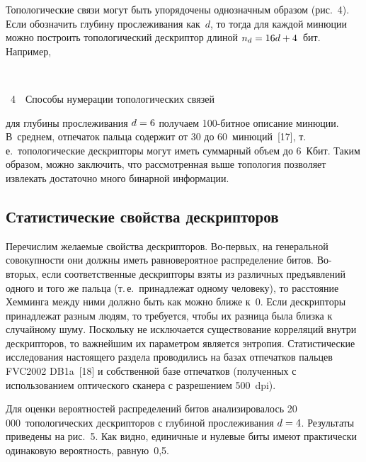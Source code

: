 \begin{multicols}{2}
      
      Топологические связи могут быть упорядочены однозначным образом (рис.~4). 
Если обозначить глу\-бин\-у прослеживания как~$d$, то тогда для каж\-дой минюции можно 
построить топологический дескриптор длиной $n_d\hm = 16d \hm+ 4$~бит. Например,\linebreak\vspace*{-12pt}
\begin{center} %
\vspace*{1pt}
\mbox{%
 \epsfxsize=77.746mm
}

\vspace*{9pt}
{{\figurename~4}\ \ \small{Способы нумерации топологических связей}}
\end{center}

\vspace*{6pt}

\addtocounter{figure}{1}


\noindent 
для глубины прослеживания $d \hm= 6$ получаем 100-бит\-ное описание минюции. 
В~среднем, отпечаток пальца содержит от 30 до 60~минюций~[17], т.\,е.\ 
топологические дескрипторы могут иметь суммарный объем до 6~Кбит. Таким образом, 
можно заключить, что рассмотренная выше топология позволяет извлекать достаточно 
много бинарной информации. 

\subsection{Статистические свойства дескрипторов}

      Перечислим желаемые свойства дескрипторов. Во-пер\-вых, на генеральной 
совокупности они должны иметь равновероятное распределение битов. Во-вто\-рых, если 
соответственные дескрипторы взяты из различных предъявлений одного и того же пальца 
(т.\,е.\ принадлежат одному человеку), то расстояние Хемминга между ними должно быть 
как можно ближе к~0. Если дескрипторы принадлежат разным людям, то требуется, чтобы 
их разница была близка к случайному шуму. Поскольку не исключается существование 
корреляций внутри дескрипторов, то важнейшим их параметром является энтропия. 
Статистические исследования настоящего раздела проводились на базах отпечатков 
пальцев FVC2002 DB1a~[18] и собственной базе отпечатков (полученных с 
использованием оптического сканера с разрешением 500~dpi).
      
      Для оценки вероятностей распределений битов анализировалось 
20\,000~топологических дескрипторов с глубиной прослеживания $d \hm= 4$. Результаты 
приведены на рис.~5. Как видно, единичные и нулевые биты имеют практически 
одинаковую вероятность, равную~0,5.



\end{multicols}
